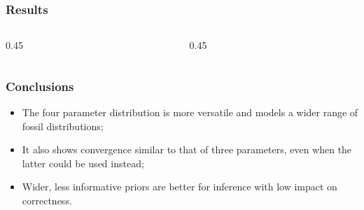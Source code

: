 \documentclass[aspectratio=169]{beamer}
\begin{document}
\begin{frame}
	\frametitle{Results}

  \begin{columns}
    \begin{column}{0.45\textwidth}
    \end{column}
    \begin{column}{0.45\textwidth}
    \end{column}
  \end{columns}
\end{frame}

%
%
%
%
%
%       
%
%
%
%
%       

\begin{frame}
	\frametitle{Conclusions} \pause

	\begin{itemize}
		\item The four parameter distribution is more versatile and models a wider range of fossil distributions; \pause
		\item It also shows convergence similar to that of three parameters, even when the latter could be used instead; \pause
		\item Wider, less informative priors are better for inference with low impact on correctness.
	\end{itemize}
\end{frame}
\end{document}
